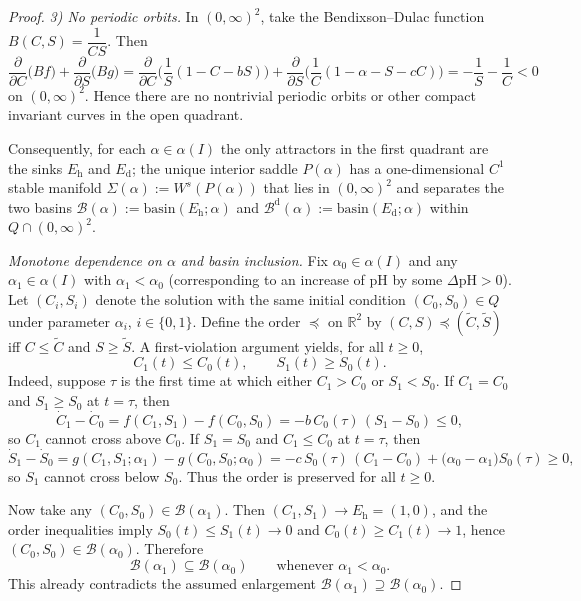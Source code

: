 \begin{proof}
\emph{3) No periodic orbits.} In \((0,\infty)^2\), take the Bendixson--Dulac function \(B(C,S)=\dfrac{1}{CS}\). Then
\[
\frac{\partial}{\partial C}\big(Bf\big)+\frac{\partial}{\partial S}\big(Bg\big)
=\frac{\partial}{\partial C}\Big(\frac{1}{S}(1-C-bS)\Big)+\frac{\partial}{\partial S}\Big(\frac{1}{C}(1-\alpha-S-cC)\Big)
=-\frac{1}{S}-\frac{1}{C}<0
\]
on \((0,\infty)^2\). Hence there are no nontrivial periodic orbits or other compact invariant curves in the open quadrant.

Consequently, for each \(\alpha\in\alpha(I)\) the only attractors in the first quadrant are the sinks \(E_{\mathrm{h}}\) and \(E_{\mathrm{d}}\); the unique interior saddle \(P(\alpha)\) has a one-dimensional \(C^1\) stable manifold \(\Sigma(\alpha):=W^s(P(\alpha))\) that lies in \((0,\infty)^2\) and separates the two basins \(\mathcal B(\alpha):=\mathrm{basin}(E_{\mathrm{h}};\alpha)\) and \(\mathcal B^{\mathrm{d}}(\alpha):=\mathrm{basin}(E_{\mathrm{d}};\alpha)\) within \(Q\cap(0,\infty)^2\).

\emph{Monotone dependence on \(\alpha\) and basin inclusion.} Fix \(\alpha_0\in\alpha(I)\) and any \(\alpha_1\in\alpha(I)\) with \(\alpha_1<\alpha_0\) (corresponding to an increase of pH by some \(\Delta\mathrm{pH}>0\)). Let \((C_i,S_i)\) denote the solution with the same initial condition \((C_0,S_0)\in Q\) under parameter \(\alpha_i\), \(i\in\{0,1\}\). Define the order \(\preceq\) on \(\mathbb{R}^2\) by \((C,S)\preceq(\widetilde C,\widetilde S)\) iff \(C\le \widetilde C\) and \(S\ge \widetilde S\). A first-violation argument yields, for all \(t\ge 0\),
\[
C_1(t)\le C_0(t),\qquad S_1(t)\ge S_0(t).
\]
Indeed, suppose \(\tau\) is the first time at which either \(C_1>C_0\) or \(S_1<S_0\). If \(C_1=C_0\) and \(S_1\ge S_0\) at \(t=\tau\), then
\[
\dot C_1-\dot C_0=f(C_1,S_1)-f(C_0,S_0)=-b\,C_0(\tau)\,(S_1-S_0)\le 0,
\]
so \(C_1\) cannot cross above \(C_0\). If \(S_1=S_0\) and \(C_1\le C_0\) at \(t=\tau\), then
\[
\dot S_1-\dot S_0=g(C_1,S_1;\alpha_1)-g(C_0,S_0;\alpha_0)=-c\,S_0(\tau)\,(C_1-C_0)+\big(\alpha_0-\alpha_1\big)S_0(\tau)\ge 0,
\]
so \(S_1\) cannot cross below \(S_0\). Thus the order is preserved for all \(t\ge 0\).

Now take any \((C_0,S_0)\in\mathcal B(\alpha_1)\). Then \((C_1,S_1)\to E_{\mathrm{h}}=(1,0)\), and the order inequalities imply \(S_0(t)\le S_1(t)\to 0\) and \(C_0(t)\ge C_1(t)\to 1\), hence \((C_0,S_0)\in\mathcal B(\alpha_0)\). Therefore
\[
\mathcal B(\alpha_1)\subseteq\mathcal B(\alpha_0)\qquad\text{whenever }\alpha_1<\alpha_0.
\]
This already contradicts the assumed enlargement \(\mathcal B(\alpha_1)\supseteq\mathcal B(\alpha_0)\).


\end{proof}
